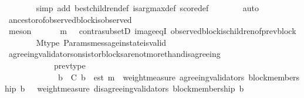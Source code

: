 \begin{isabellebody}
\ \ \ \ \ \ \isamarkupfalse%
\ {\isacharparenleft}simp\ add{\isacharcolon}\ best{\isacharunderscore}children{\isacharunderscore}def\ is{\isacharunderscore}arg{\isacharunderscore}max{\isacharunderscore}def\ score{\isacharunderscore}def{\isacharparenright}\isanewline
\ \ \ \ \ \ \isamarkupfalse%
\ {\isacharparenleft}auto{\isacharparenright}\ \isanewline
\ \ \ \ \ \ \isamarkupfalse%
\ ancestor{\isacharunderscore}of{\isacharunderscore}observed{\isacharunderscore}block{\isacharunderscore}is{\isacharunderscore}observed\isanewline
\ \ \ \ \ \ \isamarkupfalse%
\ {\isacharparenleft}meson\ {\isacartoucheopen}{\isasymsigma}\ {\isasymsubseteq}\ {\isasymsigma}{\isacharprime}{\isacartoucheclose}\ {\isacartoucheopen}{\isasymsigma}{\isacharprime}\ {\isasymin}\ {\isasymSigma}{\isacartoucheclose}\ {\isacartoucheopen}m\ {\isasymin}\ {\isasymsigma}{\isacartoucheclose}\ contra{\isacharunderscore}subsetD\ image{\isacharunderscore}eqI\ observed{\isacharunderscore}block{\isacharunderscore}is{\isacharunderscore}children{\isacharunderscore}of{\isacharunderscore}prev{\isacharunderscore}block{\isacharparenright}\ \isanewline
\ \ \ \ \ \ \isamarkupfalse%
\ M{\isacharunderscore}type\ Params{\isachardot}message{\isacharunderscore}in{\isacharunderscore}state{\isacharunderscore}is{\isacharunderscore}valid\ {\isacartoucheopen}{\isasymsigma}\ {\isasymin}\ {\isasymSigma}{\isacartoucheclose}\isanewline
\ \ \ \ \ \ \isamarkupfalse%
\ agreeing{\isacharunderscore}validators{\isacharunderscore}on{\isacharunderscore}sistor{\isacharunderscore}blocks{\isacharunderscore}are{\isacharunderscore}not{\isacharunderscore}more{\isacharunderscore}than{\isacharunderscore}disagreeing\ \isanewline
\ \ \ \ \ \ \ \ \ \ \ \ prev{\isacharunderscore}type\ \isanewline
\ \ \ \ \ \ \ \ \ \ \ \ {\isacartoucheopen}{\isasymforall}\ b{\isacharprime}\ {\isasymin}\ C{\isachardot}\ b{\isacharprime}\ {\isasymdownharpoonright}\ est\ m\ {\isasymlongrightarrow}\ weight{\isacharunderscore}measure\ {\isacharparenleft}agreeing{\isacharunderscore}validators\ {\isacharparenleft}block{\isacharunderscore}membership\ b{\isacharprime}{\isacharcomma}\ {\isasymsigma}{\isacharprime}{\isacharparenright}{\isacharparenright}\ {\isachargreater}\ weight{\isacharunderscore}measure\ {\isacharparenleft}disagreeing{\isacharunderscore}validators\ {\isacharparenleft}block{\isacharunderscore}membership\ b{\isacharprime}{\isacharcomma}\ {\isasymsigma}{\isacharprime}{\isacharparenright}{\isacharparenright}{\isacartoucheclose}\isanewline
\ \ \ \ \ \ \isamarkupfalse%

\end{isabellebody}
